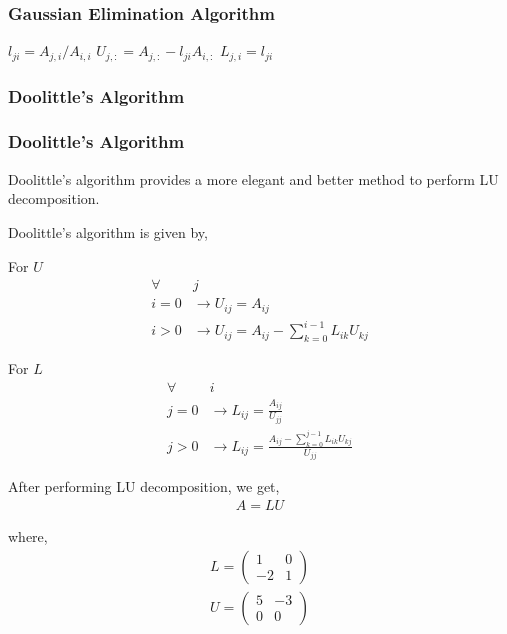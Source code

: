 \documentclass{beamer}
\theoremstyle{remark}
\newcommand{\myvec}[1]{\ensuremath{\begin{pmatrix}#1\end{pmatrix}}}
\numberwithin{equation}{section}
\begin{document}
\begin{frame}
    \frametitle{Gaussian Elimination Algorithm}

    \begin{algorithmic}
                \STATE $l_{ji} = A_{j,i}/A_{i,i}$
                \STATE $U_{j,:} = A_{j,:} - l_{ji}A_{i,:}$
                \STATE $L_{j,i} = l_{ji}$
            \ENDFOR
        \ENDFOR
    \end{algorithmic}
\end{frame}

\subsubsection{Doolittle's Algorithm}
\begin{frame}[allowframebreaks]
\frametitle{Doolittle's Algorithm}
    Doolittle's algorithm provides a more elegant and better method to perform LU decomposition.

    Doolittle's algorithm is given by,

    For $U$
    \begin{align}
        \forall &j\\
        i = 0 &\to U_{ij} = A_{ij}\\
        i > 0 &\to U_{ij} = A_{ij} - \sum_{k=0}^{i-1}L_{ik}U_{kj}
    \end{align}

    For $L$
    \begin{align}
        \forall &i\\
        j=0 &\to L_{ij} = \frac{A_{ij}}{U_{jj}}\\
        j>0 &\to L_{ij} = \frac{A_{ij} - \sum_{k=0}^{j-1}L_{ik}U_{kj}}{U_{jj}}
    \end{align}

    After performing LU decomposition, we get,
    \begin{align}
        A = LU
    \end{align}

    where,
    \begin{align}
        L = \myvec{1 & 0\\-2 & 1}\\
        U = \myvec{5 & -3\\0 & 0}
    \end{align}

\end{frame}
\end{document}

